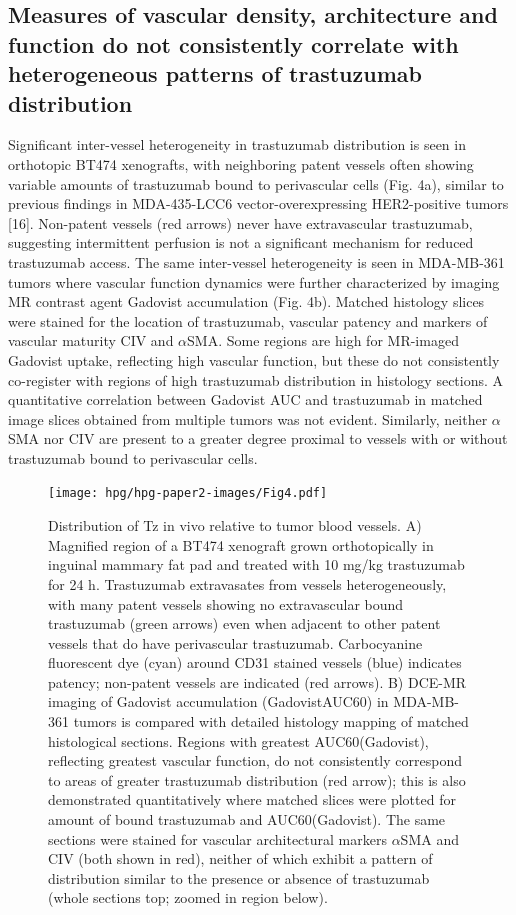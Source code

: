 \subsection{Measures of vascular density, architecture and function do not consistently correlate with heterogeneous patterns of trastuzumab distribution}

Significant inter-vessel heterogeneity in trastuzumab distribution is seen in orthotopic BT474 xenografts, with neighboring patent vessels often showing variable amounts of trastuzumab bound to perivascular cells (Fig.
4a), similar to previous findings in MDA-435-LCC6 vector-overexpressing HER2-positive tumors [16].
Non-patent vessels (red arrows) never have extravascular trastuzumab, suggesting intermittent perfusion is not a significant mechanism for reduced trastuzumab access.
The same inter-vessel heterogeneity is seen in MDA-MB-361 tumors where vascular function dynamics were further characterized by imaging MR contrast agent Gadovist accumulation (Fig.
4b).
Matched histology slices were stained for the location of trastuzumab, vascular patency and markers of vascular maturity CIV and $\alpha$SMA.
Some regions are high for MR-imaged Gadovist uptake, reflecting high vascular function, but these do not consistently co-register with regions of high trastuzumab distribution in histology sections.
A quantitative correlation between Gadovist AUC and trastuzumab in matched image slices obtained from multiple tumors was not evident.
Similarly, neither $\alpha$SMA nor CIV are present to a greater degree proximal to vessels with or without trastuzumab bound to perivascular cells.

\begin{figure}[htbp] %
   \centering
   \texttt{[image: hpg/hpg-paper2-images/Fig4.pdf]} 
   \captionsetup{width=1.2\linewidth}
   \caption{Distribution of Tz in vivo relative to tumor blood vessels. 
   A) Magnified region of a BT474 xenograft grown orthotopically in inguinal mammary fat pad and treated with 10 mg/kg trastuzumab for 24 h. 
   Trastuzumab extravasates from vessels heterogeneously, with many patent vessels showing no extravascular bound trastuzumab (green arrows) even when adjacent to other patent vessels that do have perivascular trastuzumab. 
   Carbocyanine fluorescent dye (cyan) around CD31 stained vessels (blue) indicates patency; non-patent vessels are indicated (red arrows). 
   B) DCE-MR imaging of Gadovist accumulation (GadovistAUC60) in MDA-MB-361 tumors is compared with detailed histology mapping of matched histological sections. 
   Regions with greatest AUC60(Gadovist), reflecting greatest vascular function, do not consistently correspond to areas of greater trastuzumab distribution (red arrow); this is also demonstrated quantitatively where matched slices were plotted for amount of bound trastuzumab and AUC60(Gadovist). 
   The same sections were stained for vascular architectural markers $\alpha$SMA and CIV (both shown in red), neither of which exhibit a pattern of distribution similar to the presence or absence of trastuzumab (whole sections top; zoomed in region below).}
   \label{hpgpaper2:fig4}
\end{figure}


